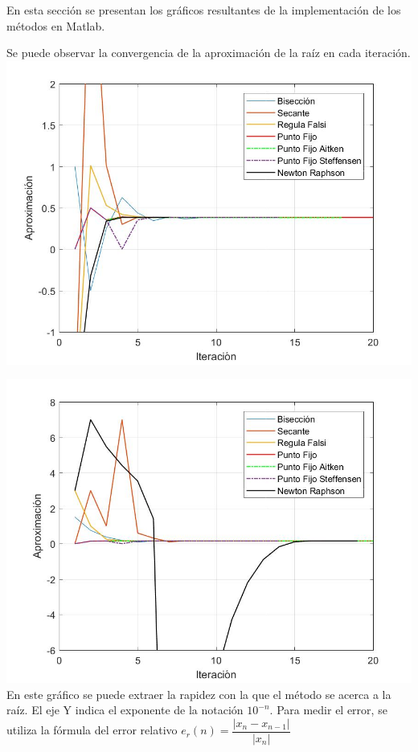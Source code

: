 \documentclass{memoria}
\begin{document}

En esta sección se presentan los gráficos resultantes de la implementación de los métodos en Matlab.


    Se puede observar la convergencia de la aproximación de la raíz en cada iteración.
     {\includegraphics[width=15cm]{imagenes/NL/Aproximaciones1.jpg}}
    
     {\includegraphics[width=15cm]{imagenes/NL/Aproximaciones2.jpg}}
En este gráfico se puede extraer la rapidez con la que el método se acerca a la raíz. El eje Y indica el exponente de la notación $10^{-n}$. Para medir el error, se utiliza la fórmula del error relativo $e_{r}(n) = \dfrac{|x_{n}-x_{n-1}|}{|x_{n}|}$
\end{document}
